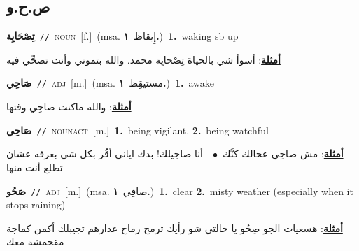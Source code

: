 \documentclass[10pt,a4paper,twoside]{article} %
\begin{document}
\begin{multicols}{2}
{{{{{{{{{{{\vspace{-3mm}
\subsection*{\color{blue}\foreignlanguage{arabic}{ص.ح.و}\color{blue}{}} 

{\setlength\topsep{0pt}\textbf{\foreignlanguage{arabic}{تِصْحَايِة}}\ {\color{gray}\texttt{//}\color{black}}\ \textsc{noun}\ [f.]\ \color{gray}(msa. \foreignlanguage{arabic}{إِيقاظ}~\foreignlanguage{arabic}{\textbf{١.}})\color{black}\ \textbf{1.}~waking sb up\  \begin{flushright}\color{gray}\foreignlanguage{arabic}{\textbf{\underline{\foreignlanguage{arabic}{أمثلة}}}: أسوأ شي بالحياة تِصْحايِة محمد. والله بتموتي وأنت تصحِّي فيه}\end{flushright}\color{black}} \vspace{2mm}

{\setlength\topsep{0pt}\textbf{\foreignlanguage{arabic}{صَاحِي}}\ {\color{gray}\texttt{//}\color{black}}\ \textsc{adj}\ [m.]\ \color{gray}(msa. \foreignlanguage{arabic}{مستيقِظ}~\foreignlanguage{arabic}{\textbf{١.}})\color{black}\ \textbf{1.}~awake\  \begin{flushright}\color{gray}\foreignlanguage{arabic}{\textbf{\underline{\foreignlanguage{arabic}{أمثلة}}}: والله ماكنت صاحِي وقتها}\end{flushright}\color{black}} \vspace{2mm}

{\setlength\topsep{0pt}\textbf{\foreignlanguage{arabic}{صَاحِي}}\ {\color{gray}\texttt{//}\color{black}}\ \textsc{noun\textunderscore act}\ [m.]\ \textbf{1.}~being vigilant.  \textbf{2.}~being watchful\  \begin{flushright}\color{gray}\foreignlanguage{arabic}{\textbf{\underline{\foreignlanguage{arabic}{أمثلة}}}: مش صاحِي عحالك كنَّك\ $\bullet$\ \  أنا صاحِيلك! بدك اياني أقُر بكل شي بعرفه عشان تطلع أنت منها}\end{flushright}\color{black}} \vspace{2mm}

{\setlength\topsep{0pt}\textbf{\foreignlanguage{arabic}{صَحُو}}\ {\color{gray}\texttt{//}\color{black}}\ \textsc{adj}\ [m.]\ \color{gray}(msa. \foreignlanguage{arabic}{صافِي}~\foreignlanguage{arabic}{\textbf{١.}})\color{black}\ \textbf{1.}~clear  \textbf{2.}~misty weather (especially when it stops raining)\  \begin{flushright}\color{gray}\foreignlanguage{arabic}{\textbf{\underline{\foreignlanguage{arabic}{أمثلة}}}: هسعيات الجو صِحُو يا خالتي شو رأيك ترمح رماح عدارهم تجيبلك أكمن كماجة مقحمشة معك}\end{flushright}\color{black}} \vspace{2mm}

}}}}}}}}}}}
\end{multicols}
\end{document}
